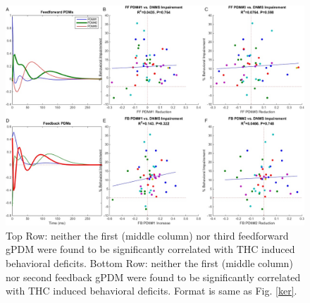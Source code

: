 \documentclass[11pt,a4paper,final]{article}
\begin{document}
\begin{figure}[!ht]
\centering
\includegraphics[width=150mm]{SFnegpdm}
\caption[Negative PDM Results]{
Top Row: neither the first (middle column) nor third feedforward gPDM were found to be significantly correlated with THC induced behavioral deficits.
Bottom Row: neither the first (middle column) nor second feedback gPDM were found to be significantly correlated with THC induced behavioral deficits.
Format is same as Fig. \ref{ker}.}
\label{SFnegpdm}
\end{figure}


\clearpage

\end{document}
